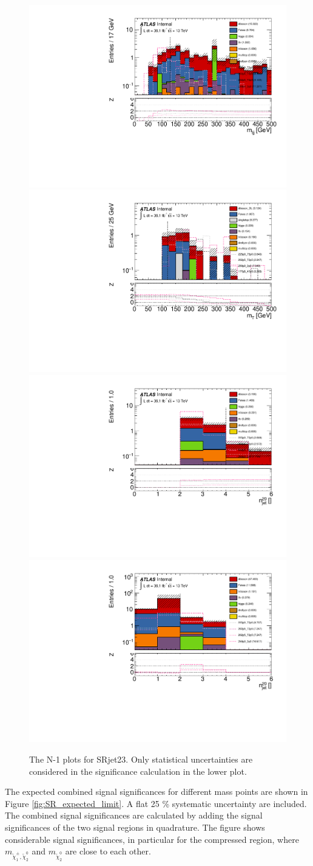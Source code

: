 \begin{figure}[htpb]
\includegraphics[width=0.45\linewidth]{data/plot/SR_redefinition/SRjet23/hmljj_comb_fakes_upd.pdf}\includegraphics[width=0.45\linewidth]{data/plot/SR_redefinition/SRjet23/lemt_fakes.pdf}\\
\includegraphics[width=0.45\linewidth]{data/plot/SR_redefinition/SRjet23/hnJet20_fakes.pdf}\includegraphics[width=0.45\linewidth]{data/plot/SR_redefinition/SRjet23/lenJet20_fakes.pdf}\\
\caption{The N-1 plots for SRjet23. Only statistical uncertainties are considered in the significance calculation in the lower plot.}
\label{fig:SRjet23_N1}
\end{figure}

The expected combined signal significances for different mass points are shown in Figure \ref{fig:SR_expected_limit}.
A flat 25 \% systematic uncertainty are included.
The combined signal significances are calculated by adding the signal significances of the two signal regions in quadrature.
The figure shows considerable signal significances, in particular for the compressed region, where $m_{\tilde{\chi}_1^\pm , \tilde{\chi}_2^0}$ and $m_{\tilde{\chi}_2^0}$ are close to each other.

